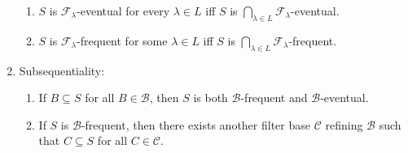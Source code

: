 \documentclass{treatise}
\begin{document}
\begin{lemma}
\begin{enumerate}
    \begin{enumerate}
        \item $S$ is $\mathcal{F}_\lambda$-eventual for every $\lambda \in L$ iff $S$ is $\bigcap_{\lambda \in L} \mathcal{F}_\lambda$-eventual.
        \item $S$ is $\mathcal{F}_\lambda$-frequent for some $\lambda \in L$ iff $S$ is $\bigcap_{\lambda \in L} \mathcal{F}_\lambda$-frequent.
    \end{enumerate}
    \item Subsequentiality:
    \begin{enumerate}
        \item If $B \subseteq S$ for all $B \in \mathcal{B}$, then $S$ is both $\mathcal{B}$-frequent and $\mathcal{B}$-eventual.
        \item If $S$ is $\mathcal{B}$-frequent, then there exists another filter base $\mathcal{C}$ refining $\mathcal{B}$ such that $C \subseteq S$ for all $C \in \mathcal{C}$.
    \end{enumerate}
\end{enumerate}
\end{lemma}
\end{document}
